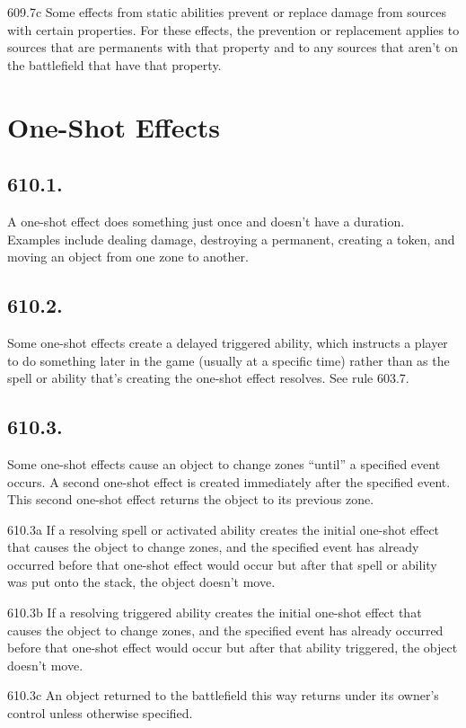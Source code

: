 609.7c Some effects from static abilities prevent or replace damage from sources with certain properties. For these effects, the prevention or replacement applies to sources that are permanents with that property and to any sources that aren’t on the battlefield that have that property.

\section{One-Shot Effects}
\subsection*{610.1.}
A one-shot effect does something just once and doesn’t have a duration. Examples include dealing damage, destroying a permanent, creating a token, and moving an object from one zone to another.

\subsection*{610.2.}
Some one-shot effects create a delayed triggered ability, which instructs a player to do something later in the game (usually at a specific time) rather than as the spell or ability that’s creating the one-shot effect resolves. See rule 603.7.

\subsection*{610.3.}
Some one-shot effects cause an object to change zones “until” a specified event occurs. A second one-shot effect is created immediately after the specified event. This second one-shot effect returns the object to its previous zone.

610.3a If a resolving spell or activated ability creates the initial one-shot effect that causes the object to change zones, and the specified event has already occurred before that one-shot effect would occur but after that spell or ability was put onto the stack, the object doesn’t move.

610.3b If a resolving triggered ability creates the initial one-shot effect that causes the object to change zones, and the specified event has already occurred before that one-shot effect would occur but after that ability triggered, the object doesn’t move.

610.3c An object returned to the battlefield this way returns under its owner’s control unless otherwise specified.

